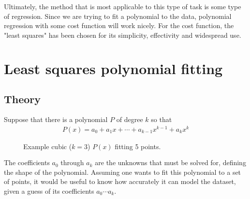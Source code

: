 \documentclass[12pt, a4paper]{article}
\begin{document}
Ultimately, the method that is most applicable to this type of task is some type
of regression. Since we are trying to fit a polynomial to the data, polynomial
regression with some cost function will work nicely. For the cost function, the
"least squares" has been chosen for its simplicity, effectivity and widespread
use.

\section{Least squares polynomial fitting}
\subsection{Theory}
Suppose that there is a polynomial $P$ of degree $k$ so that
\begin{align*}
    P(x)= a_0 + a_1 x + \cdots + a_{k-1} x^{k-1} + a_k x^k
\end{align*}


\begin{figure}
    \centering
    \caption{
        Example cubic ($k=3$) $P(x)$ fitting 5 points.
    }
    \label{fig1}
\end{figure}

The coefficients $a_0$ through $a_k$ are the unknowns that must be solved for,
defining the shape of the polynomial. Assuming one wants to fit this polynomial
to a set of points, it would be useful to know how accurately it can model the
dataset, given a guess of its coefficients $a_0 \cdots a_k$.
\end{document}
